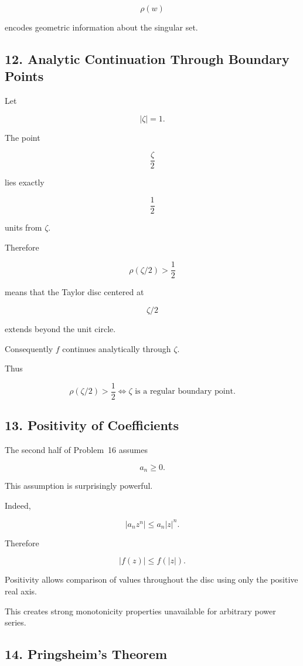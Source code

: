 \documentclass[12pt,a4paper]{article}
\theoremstyle{notespace}
\begin{document}
\[
\rho(w)
\]

encodes geometric information about the singular set.

\bigskip

\subsection{12. Analytic Continuation Through Boundary Points}

Let

\[
|\zeta|=1.
\]

The point

\[
\frac{\zeta}{2}
\]

lies exactly

\[
\frac12
\]

units from \(\zeta\).

Therefore

\[
\rho(\zeta/2)>\frac12
\]

means that the Taylor disc centered at

\[
\zeta/2
\]

extends beyond the unit circle.

Consequently \(f\) continues analytically through \(\zeta\).

Thus

\[
\boxed{
	\rho(\zeta/2)>\frac12
	\Longleftrightarrow
	\zeta
	\text{ is a regular boundary point}.
}
\]

\bigskip

\subsection{13. Positivity of Coefficients}

The second half of Problem~16 assumes

\[
a_n\ge0.
\]

This assumption is surprisingly powerful.

Indeed,

\[
|a_n z^n|
\le
a_n|z|^n.
\]

Therefore

\[
|f(z)|
\le
f(|z|).
\]

Positivity allows comparison of values throughout the disc using only the positive real axis.

This creates strong monotonicity properties unavailable for arbitrary power series.

\bigskip

\subsection{14. Pringsheim's Theorem}
\end{document}
